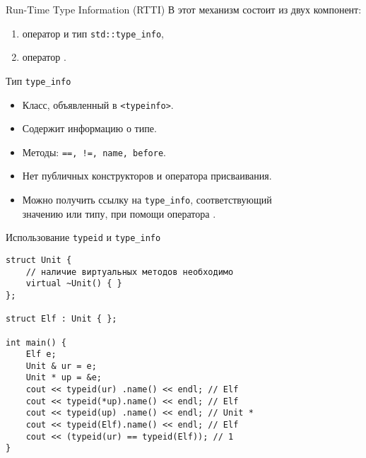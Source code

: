 \documentclass{beamer}
\begin{document}
\begin{frame}[fragile]{Run-Time Type Information (RTTI)}
В \langcpp этот механизм состоит из двух компонент:
\begin{enumerate}
    \item оператор  и тип \texttt{std::type\_info},
    \item оператор .
\end{enumerate}
\pause
\begin{block}{Тип {\tt type\_info}}
    \begin{itemize}
        \item Класс, объявленный в \texttt{<typeinfo>}.
        \item Содержит информацию о типе.
        \item Методы: \texttt{==, !=, name, before}.
        \item Нет публичных конструкторов и оператора присваивания.
        \item Можно получить ссылку на \texttt{type\_info}, соответствующий\\ значению или типу, при помощи оператора .
    \end{itemize}
\end{block}
\end{frame}

\begin{frame}[fragile]{Использование \texttt{typeid} и {\tt type\_info}}
    \begin{lstlisting}
struct Unit { 
    // наличие виртуальных методов необходимо
    virtual ~Unit() { } 
}; 

struct Elf : Unit { };

int main() {
    Elf e;
    Unit & ur = e;
    Unit * up = &e;
    cout << typeid(ur) .name() << endl; // Elf
    cout << typeid(*up).name() << endl; // Elf
    cout << typeid(up) .name() << endl; // Unit *
    cout << typeid(Elf).name() << endl; // Elf
    cout << (typeid(ur) == typeid(Elf)); // 1
}
    \end{lstlisting}
\end{frame}
\end{document}
